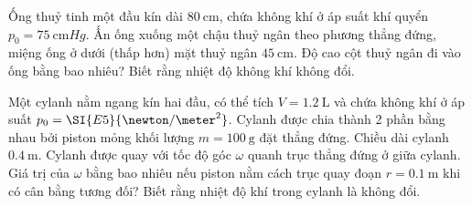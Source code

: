 \begin{ex}
	Ống thuỷ tinh một đầu kín dài $\SI{80}{\centi\meter}$, chứa không khí ở áp suất khí quyển $p_0=\SI{75}{\centi\meter Hg}$. Ấn ống xuống một chậu thuỷ ngân theo phương thẳng đứng, miệng ống ở dưới (thấp hơn) mặt thuỷ ngân $\SI{45}{\centi\meter}$. Độ cao cột thuỷ ngân đi vào ống bằng bao nhiêu? Biết rằng nhiệt độ không khí không đổi.
\end{ex}
\begin{ex}
	Một cylanh nằm ngang kín hai đầu, có thể tích $V=\SI{1.2}{\liter}$ và chứa không khí ở áp suất $p_0=\SI{E5}{\newton/\meter^2}$. Cylanh được chia thành 2 phần bằng nhau bởi piston mỏng khối lượng $m=\SI{100}{\gram}$ đặt thẳng đứng. Chiều dài cylanh $\SI{0.4}{\meter}$. Cylanh được quay với tốc độ góc $\omega$ quanh trục thẳng đứng ở giữa cylanh. Giá trị của $\omega$ bằng bao nhiêu nếu piston nằm cách trục quay đoạn $r=\SI{0.1}{\meter}$ khi có cân bằng tương đối? Biết rằng nhiệt độ khí trong cylanh là không đổi.
\end{ex}
